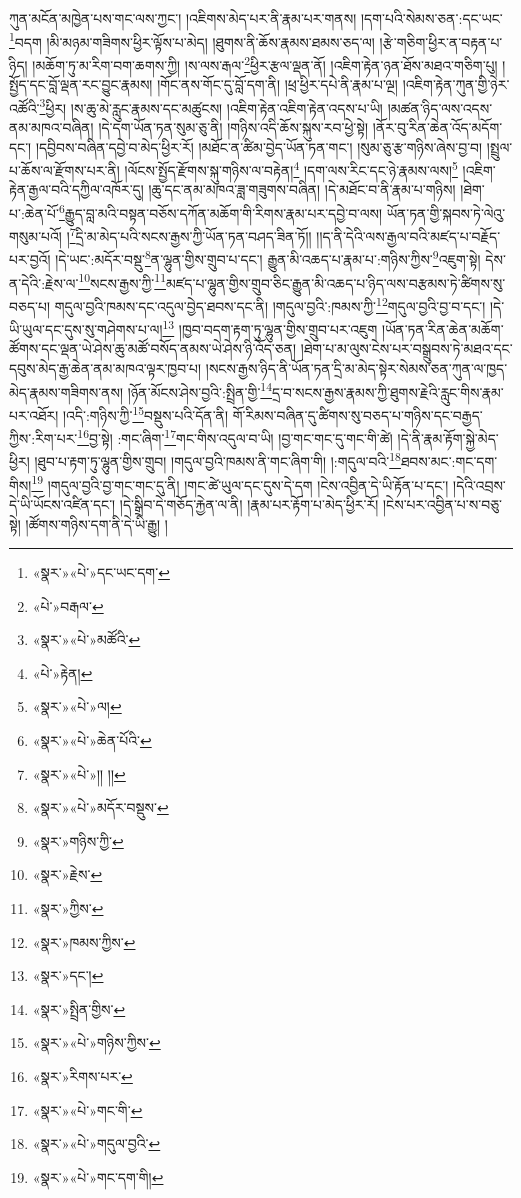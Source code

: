 ཀུན་མངོན་མཁྱེན་པས་གང་ལས་ཀྱང་། །འཇིགས་མེད་པར་ནི་རྣམ་པར་གནས། །དག་པའི་སེམས་ཅན་:དང་ཡང་\footnote{«སྣར་»«པེ་»དང་ཡང་དག་}བདག །མི་མཉམ་གཟིགས་ཕྱིར་ལྟོས་པ་མེད། །ཐུགས་ནི་ཆོས་རྣམས་ཐམས་ཅད་ལ། །རྩེ་གཅིག་ཕྱིར་ན་བརྟན་པ་ཉིད། །མཆོག་ཏུ་མ་རིག་བག་ཆགས་ཀྱི། །ས་ལས་རྒལ་\footnote{«པེ་»བརྒལ་}ཕྱིར་རྩལ་ལྡན་ནོ། །འཇིག་རྟེན་ཉན་ཐོས་མཐའ་གཅིག་པུ། །སྤྱོད་དང་བློ་ལྡན་རང་བྱུང་རྣམས། །གོང་ནས་གོང་དུ་བློ་དག་ནི། །ཕྲ་ཕྱིར་དཔེ་ནི་རྣམ་པ་ལྔ། །འཇིག་རྟེན་ཀུན་གྱི་ཉེར་འཚོའི་\footnote{«སྣར་»«པེ་»མཚོའི་}ཕྱིར། །ས་ཆུ་མེ་རླུང་རྣམས་དང་མཚུངས། །འཇིག་རྟེན་འཇིག་རྟེན་འདས་པ་ཡི། །མཚན་ཉིད་ལས་འདས་ནམ་མཁའ་བཞིན། །དེ་དག་ཡོན་ཏན་སུམ་ཅུ་ནི། །གཉིས་འདི་ཆོས་སྐུས་རབ་ཕྱེ་སྟེ། །ནོར་བུ་རིན་ཆེན་འོད་མདོག་དང་། །དབྱིབས་བཞིན་དབྱེ་བ་མེད་ཕྱིར་རོ། །མཐོང་ན་ཚིམ་བྱེད་ཡོན་ཏན་གང་། །སུམ་ཅུ་རྩ་གཉིས་ཞེས་བྱ་བ། །སྤྲུལ་པ་ཆོས་ལ་རྫོགས་པར་ནི། །ལོངས་སྤྱོད་རྫོགས་སྐུ་གཉིས་ལ་བརྟེན།\footnote{«པེ་»རྟེན།} །དག་ལས་རིང་དང་ཉེ་རྣམས་ལས།\footnote{«སྣར་»«པེ་»ལ།} །འཇིག་རྟེན་རྒྱལ་བའི་དཀྱིལ་འཁོར་དུ། །ཆུ་དང་ནམ་མཁའ་ཟླ་གཟུགས་བཞིན། །དེ་མཐོང་བ་ནི་རྣམ་པ་གཉིས། །ཐེག་པ་:ཆེན་པོ་\footnote{«སྣར་»«པེ་»ཆེན་པོའི་}རྒྱུད་བླ་མའི་བསྟན་བཅོས་དཀོན་མཆོག་གི་རིགས་རྣམ་པར་དབྱེ་བ་ལས། ཡོན་ཏན་གྱི་སྐབས་ཏེ་ལེའུ་གསུམ་པའོ། །\footnote{«སྣར་»«པེ་»།། །།}དྲི་མ་མེད་པའི་སངས་རྒྱས་ཀྱི་ཡོན་ཏན་བཤད་ཟིན་ཏོ།། །།ད་ནི་དེའི་ལས་རྒྱལ་བའི་མཛད་པ་བརྗོད་པར་བྱའོ། །དེ་ཡང་:མདོར་བསྡུ་\footnote{«སྣར་»«པེ་»མདོར་བསྡུས་}ན་ལྷུན་གྱིས་གྲུབ་པ་དང་། རྒྱུན་མི་འཆད་པ་རྣམ་པ་:གཉིས་ཀྱིས་\footnote{«སྣར་»གཉིས་ཀྱི་}འཇུག་སྟེ། དེས་ན་དེའི་:རྗེས་ལ་\footnote{«སྣར་»རྗེས་}སངས་རྒྱས་ཀྱི་\footnote{«སྣར་»ཀྱིས་}མཛད་པ་ལྷུན་གྱིས་གྲུབ་ཅིང་རྒྱུན་མི་འཆད་པ་ཉིད་ལས་བརྩམས་ཏེ་ཚིགས་སུ་བཅད་པ། གདུལ་བྱའི་ཁམས་དང་འདུལ་བྱེད་ཐབས་དང་ནི། །གདུལ་བྱའི་:ཁམས་ཀྱི་\footnote{«སྣར་»ཁམས་ཀྱིས་}གདུལ་བྱའི་བྱ་བ་དང་། །དེ་ཡི་ཡུལ་དང་དུས་སུ་གཤེགས་པ་ལ།\footnote{«སྣར་»དང་།} །ཁྱབ་བདག་རྟག་ཏུ་ལྷུན་གྱིས་གྲུབ་པར་འཇུག །ཡོན་ཏན་རིན་ཆེན་མཆོག་ཚོགས་དང་ལྡན་ཡེ་ཤེས་ཆུ་མཚོ་བསོད་ནམས་ཡེ་ཤེས་ཉི་འོད་ཅན། །ཐེག་པ་མ་ལུས་ངེས་པར་བསྒྲུབས་ཏེ་མཐའ་དང་དབུས་མེད་རྒྱ་ཆེན་ནམ་མཁའ་ལྟར་ཁྱབ་པ། །སངས་རྒྱས་ཉིད་ནི་ཡོན་ཏན་དྲི་མ་མེད་སྟེར་སེམས་ཅན་ཀུན་ལ་ཁྱད་མེད་རྣམས་གཟིགས་ནས། །ཉོན་མོངས་ཤེས་བྱའི་:སྤྲིན་གྱི་\footnote{«སྣར་»སྤྲིན་གྱིས་}དྲ་བ་སངས་རྒྱས་རྣམས་ཀྱི་ཐུགས་རྗེའི་རླུང་གིས་རྣམ་པར་འཐོར། །འདི་:གཉིས་ཀྱི་\footnote{«སྣར་»«པེ་»གཉིས་ཀྱིས་}བསྡུས་པའི་དོན་ནི། གོ་རིམས་བཞིན་དུ་ཚིགས་སུ་བཅད་པ་གཉིས་དང་བརྒྱད་ཀྱིས་:རིག་པར་\footnote{«སྣར་»རིགས་པར་}བྱ་སྟེ། :གང་ཞིག་\footnote{«སྣར་»«པེ་»གང་གི་}གང་གིས་འདུལ་བ་ཡི། །བྱ་གང་གང་དུ་གང་གི་ཚེ། །དེ་ནི་རྣམ་རྟོག་སྐྱེ་མེད་ཕྱིར། །ཐུབ་པ་རྟག་ཏུ་ལྷུན་གྱིས་གྲུབ། །གདུལ་བྱའི་ཁམས་ནི་གང་ཞིག་གི། །:གདུལ་བའི་\footnote{«སྣར་»«པེ་»གདུལ་བྱའི་}ཐབས་མང་:གང་དག་གིས།\footnote{«སྣར་»«པེ་»གང་དག་གི།} །གདུལ་བྱའི་བྱ་གང་གང་དུ་ནི། །གང་ཚེ་ཡུལ་དང་དུས་དེ་དག །ངེས་འབྱིན་དེ་ཡི་རྟོན་པ་དང་། །དེའི་འབྲས་དེ་ཡི་ཡོངས་འཛིན་དང་། །དེ་སྒྲིབ་དེ་གཅོད་རྐྱེན་ལ་ནི། །རྣམ་པར་རྟོག་པ་མེད་ཕྱིར་རོ། །ངེས་པར་འབྱིན་པ་ས་བཅུ་སྟེ། །ཚོགས་གཉིས་དག་ནི་དེ་ཡི་རྒྱུ། །
